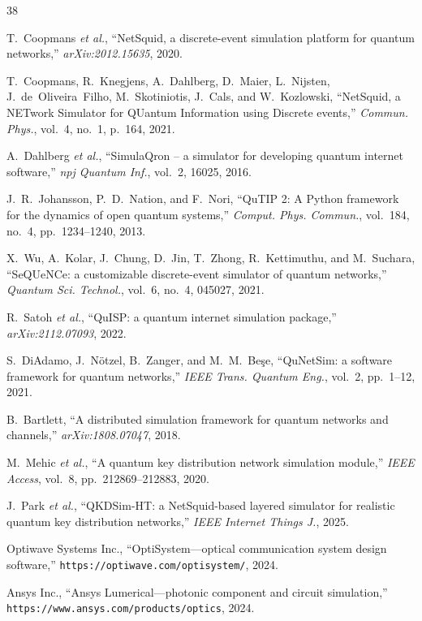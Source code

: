 \documentclass[3p,times,preprint]{elsarticle}
\begin{document}
\begin{thebibliography}{38}

T.~Coopmans \textit{et al.}, ``NetSquid, a discrete-event simulation
platform for quantum networks,'' \textit{arXiv:2012.15635}, 2020.

T.~Coopmans, R.~Knegjens, A.~Dahlberg, D.~Maier, L.~Nijsten,
J.~de~Oliveira~Filho, M.~Skotiniotis, J.~Cals, and W.~Kozlowski,
``NetSquid, a NETwork Simulator for QUantum Information using Discrete
events,'' \textit{Commun. Phys.}, vol.~4, no.~1, p.~164, 2021.

A.~Dahlberg \textit{et al.}, ``SimulaQron -- a simulator for developing
quantum internet software,'' \textit{npj Quantum Inf.}, vol.~2, 16025, 2016.

J.~R.~Johansson, P.~D.~Nation, and F.~Nori, ``QuTIP 2: A Python framework
for the dynamics of open quantum systems,'' \textit{Comput. Phys. Commun.},
vol.~184, no.~4, pp.~1234--1240, 2013.

X.~Wu, A.~Kolar, J.~Chung, D.~Jin, T.~Zhong, R.~Kettimuthu, and
M.~Suchara, ``SeQUeNCe: a customizable discrete-event simulator of
quantum networks,'' \textit{Quantum Sci. Technol.}, vol.~6, no.~4,
045027, 2021.

R.~Satoh \textit{et al.}, ``QuISP: a quantum internet simulation
package,'' \textit{arXiv:2112.07093}, 2022.

S.~DiAdamo, J.~N\"otzel, B.~Zanger, and M.~M.~Be\c{s}e,
``QuNetSim: a software framework for quantum networks,''
\textit{IEEE Trans. Quantum Eng.}, vol.~2, pp.~1--12, 2021.

B.~Bartlett, ``A distributed simulation framework for quantum networks
and channels,'' \textit{arXiv:1808.07047}, 2018.

M.~Mehic \textit{et al.}, ``A quantum key distribution network simulation
module,'' \textit{IEEE Access}, vol.~8, pp.~212869--212883, 2020.

J.~Park \textit{et al.}, ``QKDSim-HT: a NetSquid-based layered simulator
for realistic quantum key distribution networks,'' \textit{IEEE Internet
Things J.}, 2025.

Optiwave Systems Inc., ``OptiSystem---optical communication system
design software,'' \texttt{https://optiwave.com/optisystem/}, 2024.

Ansys Inc., ``Ansys Lumerical---photonic component and circuit
simulation,'' \texttt{https://www.ansys.com/products/optics}, 2024.


\end{thebibliography}
\end{document}
